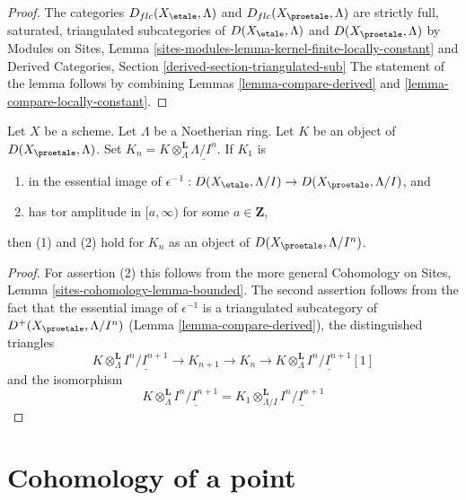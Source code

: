 \begin{proof}
The categories $D_{flc}(X_\etale, \Lambda)$ and $D_{flc}(X_\proetale, \Lambda)$
are strictly full, saturated, triangulated subcategories of
$D(X_\etale, \Lambda)$ and $D(X_\proetale, \Lambda)$
by Modules on Sites, Lemma
\ref{sites-modules-lemma-kernel-finite-locally-constant}
and
Derived Categories, Section \ref{derived-section-triangulated-sub}
The statement of the lemma follows by combining
Lemmas \ref{lemma-compare-derived} and
\ref{lemma-compare-locally-constant}.
\end{proof}

\begin{lemma}
\label{lemma-compare-truncations}
Let $X$ be a scheme. Let $\Lambda$ be a Noetherian ring.
Let $K$ be an object of $D(X_\proetale, \Lambda)$.
Set $K_n = K \otimes_\Lambda^\mathbf{L} \underline{\Lambda/I^n}$.
If $K_1$ is
\begin{enumerate}
\item in the essential image of
$\epsilon^{-1} :D(X_\etale, \Lambda/I) \to D(X_\proetale, \Lambda/I)$, and
\item has tor amplitude in $[a,\infty)$ for some $a \in \mathbf{Z}$,
\end{enumerate}
then (1) and (2) hold for $K_n$ as an object of $D(X_\proetale, \Lambda/I^n)$.
\end{lemma}

\begin{proof}
For assertion (2) this follows from the more general
Cohomology on Sites, Lemma \ref{sites-cohomology-lemma-bounded}.
The second assertion follows from the fact that
the essential image of $\epsilon^{-1}$ is a triangulated
subcategory of $D^+(X_\proetale, \Lambda/I^n)$
(Lemma \ref{lemma-compare-derived}),
the distinguished triangles
$$
K \otimes_\Lambda^\mathbf{L} \underline{I^n/I^{n + 1}} \to
K_{n + 1} \to
K_n \to
K \otimes_\Lambda^\mathbf{L} \underline{I^n/I^{n + 1}}[1]
$$
and the isomorphism
$$
K \otimes_\Lambda^\mathbf{L} \underline{I^n/I^{n + 1}} =
K_1 \otimes_{\Lambda/I}^\mathbf{L} \underline{I^n/I^{n + 1}}
$$
\end{proof}






\section{Cohomology of a point}
\label{section-cohomology-point}

